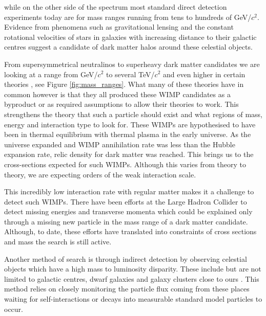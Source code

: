 \documentclass[11pt]{article} %
\begin{document}
while on the other side of the spectrum most standard direct detection experiments today \cite{Agnes_2015} \cite{McKinsey_2016}  are for mass ranges running from tens to hundreds of GeV/$c^2$.
Evidence from phenomena such as gravitational lensing \cite{wittman2000detection} and the constant rotational velocities of stars in galaxies with increasing
distance to their galactic centres \cite{oort1932force} suggest a candidate of dark matter halos around these celestial objects.
\\
\par From supersymmetrical neutralinos to superheavy dark matter candidates we are looking at a range from GeV/$c^2$ to several TeV/$c^2$ and even higher in certain theories \cite{roszkowski2004particle}, see Figure \ref{fig:mass_ranges}.
What many of these theories have in common however is that they all produced these WIMP candidates as a byproduct or as required assumptions
to allow their theories to work.
This strengthens the theory that such a particle should exist and what regions of mass, energy and interaction type to look for.
These WIMPs are hypothesised to have been in thermal equilibrium with thermal plasma in the early universe.
As the universe expanded and WIMP annihilation rate was less than the Hubble expansion rate, relic density for dark matter was reached.
This brings us to the cross-sections expected for such WIMPs.
Although this varies from theory to theory, we are expecting orders of the weak interaction scale.
\\
\par This incredibly low interaction rate with regular matter makes it a challenge to detect such WIMPs.
There have been efforts at the Large Hadron Collider \cite{aad2013search} \cite{chatrchyan2012search} to detect missing energies and transverse momenta which could be
explained only through a missing new particle in the mass range of a dark matter candidate.
Although, to date, these efforts have translated into constraints of cross sections and mass the search is still active.
\\
\par Another method of search is through indirect detection \cite{gaskins2016review} by observing celestial objects which have a high mass to luminosity disparity.
These include but are not limited to galactic centres, dwarf galaxies and galaxy clusters close to ours \cite{harvey2015nongravitational}.
This method relies on closely monitoring the particle flux coming from these places waiting for self-interactions or decays into measurable standard model particles to occur.
\end{document}
